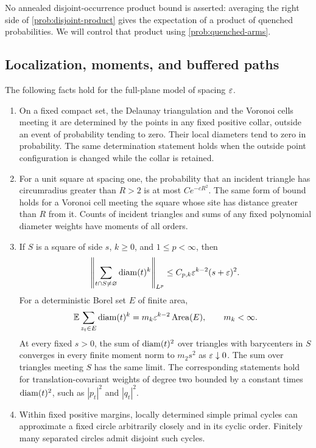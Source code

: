 No annealed disjoint-occurrence product bound is asserted: averaging the
right side of \eqref{prob:disjoint-product} gives the expectation of a
product of quenched probabilities.  We will control that product using
\eqref{prob:quenched-arms}.

\subsection{Localization, moments, and buffered paths}

\begin{lemma}\label{lemma:mesh}
The following facts hold for the full-plane model of spacing $\varepsilon$.
\begin{enumerate}[label=(\roman*)]
\item On a fixed compact set, the Delaunay triangulation and the Voronoi
cells meeting it are determined by the points in any fixed positive
collar, outside an event of probability tending to zero.  Their local
diameters tend to zero in probability.  The same determination statement
holds when the outside point configuration is changed while the collar
is retained.
\item For a unit square at spacing one, the probability that an incident
triangle has circumradius greater than $R>2$ is at most $Ce^{-cR^2}$.
The same form of bound holds for a Voronoi cell meeting the square whose
site has distance greater than $R$ from it.  Counts of incident triangles
and sums of any fixed polynomial diameter weights have moments of all
orders.
\item If $S$ is a square of side $s$, $k\ge0$, and $1\le p<\infty$, then
\begin{equation}\label{prob:mesh-moments}
 \left\|\sum_{t\cap S\ne\varnothing}\operatorname{diam}(t)^k\right\|_{L^p}
   \le C_{p,k}\varepsilon^{k-2}(s+\varepsilon)^2.
\end{equation}
For a deterministic Borel set $E$ of finite area,
\begin{equation}\label{prob:barycenter-intensity}
 \mathbb E\sum_{z_t\in E}\operatorname{diam}(t)^k
    =m_k\varepsilon^{k-2}\operatorname{Area}(E),\qquad m_k<\infty.
\end{equation}
At every fixed $s>0$, the sum of $\operatorname{diam}(t)^2$ over triangles with
barycenters in $S$ converges in every finite moment norm to $m_2s^2$ as
$\varepsilon\downarrow0$.  The sum over triangles meeting $S$ has the same limit.
The corresponding statements hold for translation-covariant weights of
degree two bounded by a constant times $\operatorname{diam}(t)^2$, such as $|p_t|^2$
and $|q_t|^2$.
\item Within fixed positive margins, locally determined simple primal
cycles can approximate a fixed circle arbitrarily closely and in its
cyclic order.  Finitely many separated circles admit disjoint such cycles.
\end{enumerate}
\end{lemma}

